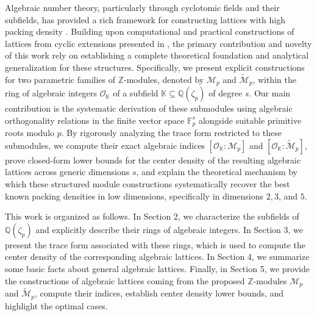 \documentclass{amsart}
\begin{document}
Algebraic number theory, particularly through cyclotomic fields and their subfields, has provided a rich framework for constructing lattices with high packing density \cite{jorge-1,oggier-1,bayer-1}. Building upon computational and practical constructions of lattices from cyclic extensions presented in \cite{interlando-1}, the primary contribution and novelty of this work rely on establishing a complete theoretical foundation and analytical generalization for these structures. Specifically, we present explicit constructions for two parametric families of $\mathbb{Z}$-modules, denoted by $\mathcal{M}_p$ and $\tilde{\mathcal{M}}_p$, within the ring of algebraic integers $\mathcal{O}_{\mathbb{K}}$ of a subfield $\mathbb{K} \subseteq \mathbb{Q}(\zeta_p)$ of degree $s$. Our main contribution is the systematic derivation of these submodules using algebraic orthogonality relations in the finite vector space $\mathbb{F}_p^s$ alongside suitable primitive roots modulo $p$. By rigorously analyzing the trace form restricted to these submodules, we compute their exact algebraic indices $[\mathcal{O}_{\mathbb{K}} : \mathcal{M}_p]$ and $[\mathcal{O}_{\mathbb{K}} : \tilde{\mathcal{M}}_p]$, prove closed-form lower bounds for the center density of the resulting algebraic lattices across generic dimensions $s$, and explain the theoretical mechanism by which these structured module constructions systematically recover the best known packing densities in low dimensions, specifically in dimensions $2, 3$, and $5$.

This work is organized as follows. In Section 2, we characterize the subfields of $\mathbb{Q}(\zeta_p)$ and explicitly describe their rings of algebraic integers. In Section 3, we present the trace form associated with these rings, which is used to compute the center density of the corresponding algebraic lattices. In Section 4, we summarize some basic facts about general algebraic lattices. Finally, in Section 5, we provide the constructions of algebraic lattices coming from the proposed $\mathbb{Z}$-modules $\mathcal{M}_p$ and $\tilde{\mathcal{M}}_p$, compute their indices, establish center density lower bounds, and highlight the optimal cases.
\end{document}
